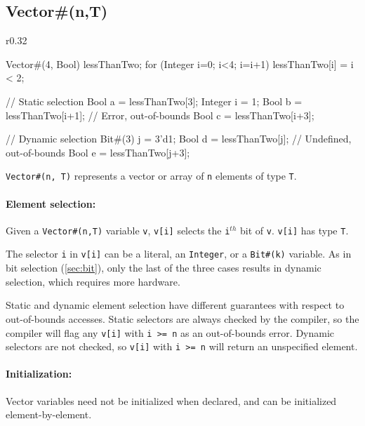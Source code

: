 \subsection{Vector\#(n,T)}
\label{sec:vector}

\begin{wrapfigure}{r}{0.32\columnwidth}
\vspace{-5em}
\begin{mscode}
Vector#(4, Bool) lessThanTwo;
for (Integer i=0; i<4; i=i+1)
  lessThanTwo[i] = i < 2;

// Static selection
Bool a = lessThanTwo[3];
Integer i = 1;
Bool b = lessThanTwo[i+1];
// Error, out-of-bounds
Bool c = lessThanTwo[i+3];

// Dynamic selection
Bit#(3) j = 3'd1;
Bool d = lessThanTwo[j];
// Undefined, out-of-bounds
Bool e = lessThanTwo[j+3];
\end{mscode}
\vspace{-4.5em}
\end{wrapfigure}


\verb|Vector#(n, T)| represents a vector or array of \verb|n| elements of type \verb|T|.

\paragraph{Element selection:} 
Given a \verb|Vector#(n,T)| variable \verb|v|,
\verb|v[i]| selects the \verb|i|$^{th}$ bit of \verb|v|.
\verb|v[i]| has type \verb|T|.

The selector \verb|i| in \verb|v[i]| can be a literal, an \verb|Integer|, or a \verb|Bit#(k)| variable.
As in bit selection (\autoref{sec:bit}), only the last of the three cases results in dynamic selection,
which requires more hardware.

Static and dynamic element selection have different guarantees with respect to out-of-bounds accesses.
Static selectors are always checked by the compiler,
so the compiler will flag any \verb|v[i]| with \verb|i >= n| as an out-of-bounds error.
Dynamic selectors are not checked, so \verb|v[i]| with \verb|i >= n| will return an unspecified element.

\paragraph{Initialization:} Vector variables need not be initialized when declared,
and can be initialized element-by-element.

